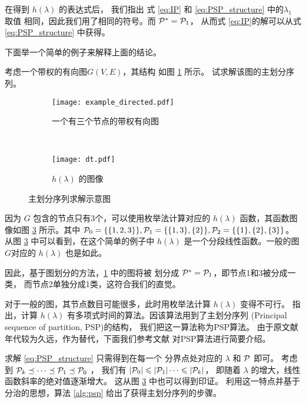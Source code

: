 在得到 $h(\lambda)$ 的表达式后，
我们指出 式 \eqref{eq:IP} 和
\eqref{eq:PSP_structure} 中的$\lambda_1$ 取值
相同，因此我们用了相同的符号。而 $\P^*=\P_1$，
从而式 \eqref{eq:IP}的解可以从式 \eqref{eq:PSP_structure}
中获得。

下面举一个简单的例子来解释上面的结论。
\begin{example}\label{ex:psp}
考虑一个带权的有向图$G(V,E)$，其结构
如图 \ref{fig:example_directed} 所示。
试求解该图的主划分序列。
\end{example}
\begin{figure}
  \centering
  \begin{subfigure}[b]{0.4\linewidth}
  \texttt{[image: example\_directed.pdf]}
  \caption{一个有三个节点的带权有向图}
  \label{fig:example_directed}
  \end{subfigure}~
  \begin{subfigure}[b]{0.5\linewidth}
    \texttt{[image: dt.pdf]}
    \caption{$h(\lambda)$ 的图像}
    \label{fig:dt}
    \end{subfigure}  
    \caption{主划分序列求解示意图}
\end{figure}

因为
$G$ 包含的节点只有3个，可以使用枚举法计算对应的 $h(\lambda)$
函数，其函数图像如图 \ref{fig:dt} 所示。其中
$\P_0=\{ \{1,2,3\} \}, \P_1 = \{\{1,3\}, \{2\} \},
\P_2 =\{\{1\},\{2\},\{3\} \}$。
从图 \ref{fig:dt} 中可以看到，在这个简单的例子中
$h(\lambda)$
是一个分段线性函数。一般的图$G$对应的
$h(\lambda)$ 也是如此。

因此，基于图划分的方法，\ref{fig:example_directed}
中的图将被 划分成 $\P^*=\P_1$，即节点1和3被分成一类，
而节点2单独分成1类，这符合我们的直觉。

对于一般的图，其节点数目可能很多，此时用枚举法计算
$h(\lambda)$ 变得不可行。\citet{narayanan} 指出，计算
$h(\lambda)$ 有多项式时间的算法。因该算法用到了主划分序列 (Principal sequence of partition, PSP)的结构，
我们把这一算法称为PSP算法。
由于原文献年代较为久远，作为替代，下面我们参考文献
对PSP算法进行简要介绍。

求解 \eqref{eq:PSP_structure} 只需得到在每一个
分界点处对应的 $\lambda$ 和 $\P$ 即可。
考虑到 $\P_k \preceq \dots \preceq \P_1 \preceq \P_0$
，
我们有 $|\P_0| \leq |\P_1| \dots \leq |\P_k|$，
即随着 $\lambda $ 的增大，线性函数斜率的绝对值逐渐增大。
这从图 \ref{fig:dt} 中也可以得到印证。
利用这一特点并基于分治的思想，算法 \ref{alg:psp} 
给出了获得主划分序列的步骤。

